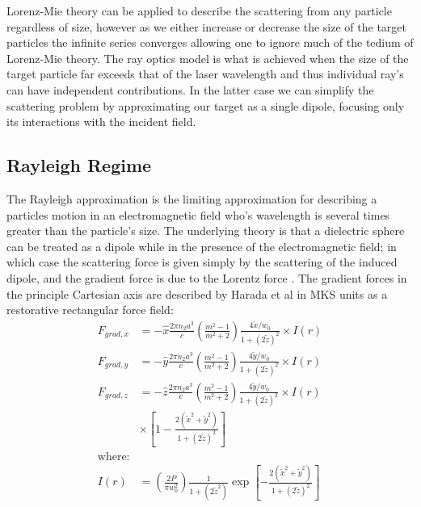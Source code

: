 Lorenz-Mie theory can be applied to describe the scattering from any particle regardless of size, however as we either increase or decrease the size of the target particles the infinite series converges allowing one to ignore much of the tedium of Lorenz-Mie theory. The ray optics model is what is achieved when the size of the target particle far exceeds that of the laser wavelength and thus individual ray's can have independent contributions. In the latter case we can simplify the scattering problem by approximating our target as a single dipole, focusing only its interactions with the incident field.


\subsection{Rayleigh Regime}

The Rayleigh approximation is the limiting approximation for describing a particles motion in an electromagnetic field who's wavelength is several times greater than the particle's size. The underlying theory is that a dielectric sphere can be treated as a dipole while in the presence of the electromagnetic field; in which case the scattering force is given simply by the scattering of the induced dipole, and the gradient force is due to the Lorentz force \cite{Gordon1973}. The gradient forces in the principle Cartesian axis are described by Harada et al \cite{YasuhiroHarada1996} in MKS units as a restorative rectangular force field:
\begin{align}
  F_{grad,x}
  &=-\hat{x} \frac{2\pi n_2 a^3}{c}
    \left(\frac{m^2-1}{m^2+2}\right) \frac{4\tilde{x}/w_0}{1+(2\tilde{z})^2} \times I(r)
  \\
  F_{grad,y}
  &=-\hat{y} \frac{2\pi n_2 a^3}{c}
    \left(\frac{m^2-1}{m^2+2}\right) \frac{4\tilde{y}/w_0}{1+(2\tilde{z})^2} \times I(r)
  \\
  F_{grad,z}
  &=-\hat{z} \frac{2\pi n_2 a^3}{c}
    \left(\frac{m^2-1}{m^2+2}\right) \frac{4\tilde{y}/w_0}{1+(2\tilde{z})^2}
    \nonumber \times I(r)
  \\ 
  & \times \left[1-\frac{2(\tilde{x}^2+\tilde{y}^2)}{1+(2\tilde{z})^2} \right]
  \\
  \text{where:}
  \nonumber
  \\
	I(r) &= \left(\frac{2P}{\pi w_0^2}\right) \frac{1}{1+(2\tilde{z}^2)} 
	\exp \left[ - \frac{2(\tilde{x}^2+\tilde{y}^2)}{1+(2\tilde{z})^2} \right]
\end{align}

